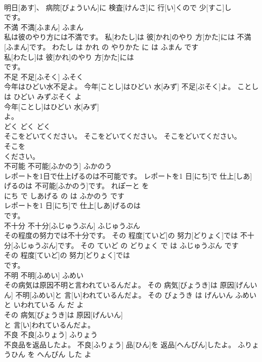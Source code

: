\documentclass[8pt]{extreport}
\begin{document}
\begin{CJK}{UTF8}{min}
\\	明日[あす]、 病院[びょういん]に 検査[けんさ]に 行[い]くので 少[すこ]し
\\	です。			
\\	不満	不満[ふまん]	ふまん	
\\	私は彼のやり方には不満です。	私[わたし]は 彼[かれ]のやり 方[かた]には 不満[ふまん]です。	わたし は かれ の やりかた に は ふまん です	
\\	私[わたし]は 彼[かれ]のやり 方[かた]には
\\	です。			
\\	不足	不足[ふそく]	ふそく	
\\	今年はひどい水不足よ。	今年[ことし]はひどい 水[みず] 不足[ぶそく]よ。	ことし は ひどい みずぶそく よ	
\\	今年[ことし]はひどい 水[みず]
\\	よ。			
\\	どく	どく	どく	
\\	そこをどいてください。	そこをどいてください。	そこをどいてください。	
\\	そこを
\\	ください。			
\\	不可能	不可能[ふかのう]	ふかのう	
\\	レポートを1日で仕上げるのは不可能です。	レポートを1 日[にち]で 仕上[しあ]げるのは 不可能[ふかのう]です。	れぽーと を 
\\	にち で しあげる の は ふかのう です	
\\	レポートを1 日[にち]で 仕上[しあ]げるのは
\\	です。			
\\	不十分	不十分[ふじゅうぶん]	ふじゅうぶん	
\\	その程度の努力では不十分です。	その 程度[ていど]の 努力[どりょく]では 不十分[ふじゅうぶん]です。	その ていど の どりょく で は ふじゅうぶん です	
\\	その 程度[ていど]の 努力[どりょく]では
\\	です。			
\\	不明	不明[ふめい]	ふめい	
\\	その病気は原因不明と言われているんだよ。	その 病気[びょうき]は 原因[げんいん] 不明[ふめい]と 言[い]われているんだよ。	その びょうき は げんいん ふめい と いわれている ん だ よ	
\\	その 病気[びょうき]は 原因[げんいん]
\\	と 言[い]われているんだよ。			
\\	不良	不良[ふりょう]	ふりょう	
\\	不良品を返品したよ。	不良[ふりょう] 品[ひん]を 返品[へんぴん]したよ。	ふりょうひん を へんぴん した よ	

\end{CJK}
\end{document}
